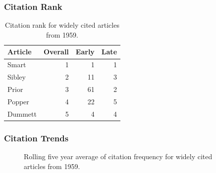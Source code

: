 \documentclass[
  10pt,
  letterpaper,
  DIV=11,
  numbers=noendperiod,
  twoside]{scrartcl}
\begin{document}
\subsubsection*{Citation Rank}\label{sec-rank-1959}

\begin{longtable}[]{@{}lrrr@{}}

\caption{\label{tbl-citation-rank-1959}Citation rank for widely cited
articles from 1959.}

\tabularnewline

\toprule\noalign{}
Article & Overall & Early & Late \\
\midrule\noalign{}
\endhead
\bottomrule\noalign{}
\endlastfoot
Smart & 1 & 1 & 1 \\
Sibley & 2 & 11 & 3 \\
Prior & 3 & 61 & 2 \\
Popper & 4 & 22 & 5 \\
Dummett & 5 & 4 & 4 \\

\end{longtable}

\subsubsection*{Citation Trends}\label{sec-trends-1959}

\begin{figure}


\caption{\label{fig-citation-spaghetti-1959}Rolling five year average of
citation frequency for widely cited articles from 1959.}

\end{figure}%
\end{document}
